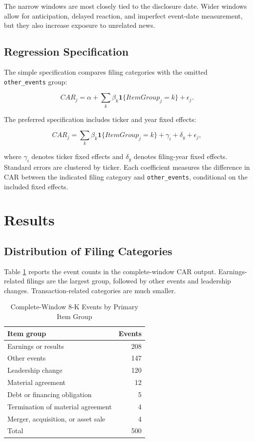 \documentclass[12pt]{article}
\begin{document}
The narrow windows are most closely tied to the disclosure date. Wider windows allow for anticipation, delayed reaction, and imperfect event-date measurement, but they also increase exposure to unrelated news.

\subsection{Regression Specification}

The simple specification compares filing categories with the omitted \texttt{other\_events} group:

\begin{equation}
CAR_j=\alpha+\sum_k\beta_k\mathbf{1}\{ItemGroup_j=k\}+\epsilon_j.
\end{equation}

The preferred specification includes ticker and year fixed effects:

\begin{equation}
CAR_j=\sum_k\beta_k\mathbf{1}\{ItemGroup_j=k\}+\gamma_i+\delta_y+\epsilon_j,
\end{equation}

where $\gamma_i$ denotes ticker fixed effects and $\delta_y$ denotes filing-year fixed effects. Standard errors are clustered by ticker. Each coefficient measures the difference in CAR between the indicated filing category and \texttt{other\_events}, conditional on the included fixed effects.

\section{Results}

\subsection{Distribution of Filing Categories}

Table \ref{tab:item_counts} reports the event counts in the complete-window CAR output. Earnings-related filings are the largest group, followed by other events and leadership changes. Transaction-related categories are much smaller.

\begin{table}[H]
\centering
\caption{Complete-Window 8-K Events by Primary Item Group}
\label{tab:item_counts}
\begin{tabular}{lr}
\toprule
Item group & Events \\
\midrule
Earnings or results & 208 \\
Other events & 147 \\
Leadership change & 120 \\
Material agreement & 12 \\
Debt or financing obligation & 5 \\
Termination of material agreement & 4 \\
Merger, acquisition, or asset sale & 4 \\
\midrule
Total & 500 \\
\bottomrule
\end{tabular}
\end{table}
\end{document}
